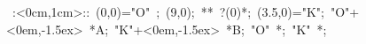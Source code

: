 \hbox{
\xy    <1cm,0cm>:<0cm,1cm>::
       (0,0)="O" ; (9,0); **\dir{-} ?(0)*\dir{<}; (3.5,0)="K"; 
       "O"+<0em,-1.5ex> *{A};
       "K"+<0em,-1.5ex> *{B};
       "O" *{\bullet};
       "K" *{\bullet};
       \endxy}
